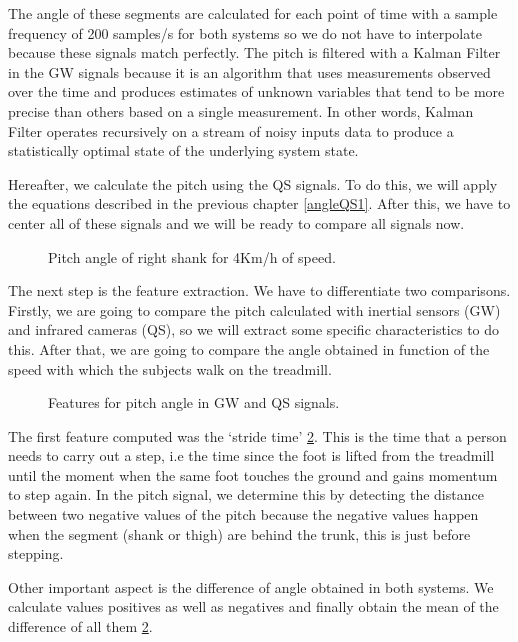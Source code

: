 The angle of these segments are calculated for each point of time with a sample frequency of 200 samples/s for both systems so we do not have to interpolate because these signals match perfectly. The pitch is filtered with a Kalman Filter in the GW signals because it is an algorithm that uses measurements observed over the time and produces estimates of unknown variables that tend to be more precise than others based on a single measurement. In other words, Kalman Filter operates recursively on a stream of noisy inputs data to produce a statistically optimal state of the underlying system state\cite{Kalman Filter}.

Hereafter, we calculate the pitch using the QS signals. To do this, we will apply the equations described in the previous chapter \ref{angleQS1}.
After this, we have to center all of these signals and we will be ready to compare all signals now.

\begin{figure}[H]
	\centering
	\caption{Pitch angle of right shank for 4Km/h of speed.}
	\label{fig:signalGWQS}
\end{figure}

The next step is the feature extraction. We have to differentiate two comparisons. Firstly, we are going to compare the pitch calculated with inertial sensors (GW) and infrared cameras (QS), so we will extract some specific characteristics to do this. After that, we are going to compare the angle obtained in function of the speed with which the subjects walk on the treadmill.
\begin{figure}[H]
	\centering
	\caption{Features for pitch angle in GW and QS signals.}
	\label{fig:featuresGWQS}
\end{figure}
The first feature computed was the ‘stride time’ \ref{fig:featuresGWQS}. This is the time that a person needs to carry out a step, i.e the time since the foot is lifted from the treadmill until the moment when the same foot touches the ground and gains momentum to step again. In the pitch signal, we determine this by detecting the distance between two negative values of the pitch because the negative values happen when the segment (shank or thigh) are behind the trunk, this is just before stepping.

Other important aspect is the difference of angle obtained in both systems. We calculate values positives as well as negatives and finally obtain the mean of the difference of all them \ref{fig:featuresGWQS}.


